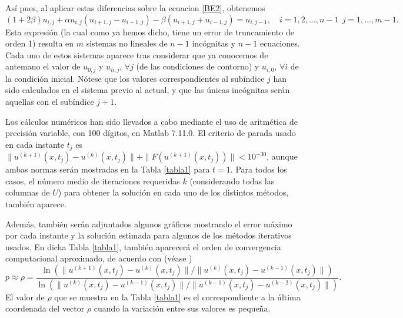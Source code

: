 Así pues, al aplicar estas diferencias sobre la ecuacion \eqref{BE2}, obtenemos
\begin{equation*}
(1+2\beta)u_{i,j}+\alpha u_{i,j}(u_{i+1,j}-u_{i-1,j})-\beta (u_{i+1,j}+u_{i-1,j})=u_{i,j-1},
\quad i=1,2,\ldots,n-1 \ \ j=1,\ldots,m-1.
\end{equation*}
Esta expresión (la cual como ya hemos dicho, tiene un error de truncamiento de orden 1) resulta en $m$ sistemas no lineales de $n-1$ incógnitas y $n-1$ ecuaciones. Cada uno de estos sistemas aparece tras considerar que ya conocemos de antemano el valor de $u_{0,j}$ y	$u_{n,j}$, $\forall j$ (de las condiciones de contorno) y $u_{i,0}$,
$\forall i$ de la condición inicial. Nótese que los valores correspondientes al subíndice $j$ han sido calculados en el sistema previo al actual, y que las únicas incógnitas serán aquellas con el subíndice $j+1$.

Los cálculos numéricos han sido llevados a cabo mediante el uso de aritmética de precisión variable, con 100 dígitos, en Matlab 7.11.0. El criterio de parada usado en cada instante $t_j$ es 
$\|u^{(k+1)}(x,t_j)-u^{(k)}(x,t_j)\|+\|F(u^{(k+1)}(x,t_j))\|<10^{-30}$, aunque ambas normas serán mostradas en la Tabla \ref{tabla1} para $t=1$. Para todos los casos, el número medio de iteraciones requeridas $\overline{k}$ (considerando todas las columnas de $U$) para obtener la solución en cada uno de los distintos métodos, también aparece.

Además, también serán adjuntados algunos gráficos mostrando el error máximo por cada instante y la solución estimada para algunos de los métodos iterativos usados. En dicha Tabla \ref{tabla1}, también aparecerá el orden de convergencia computacional aproximado, de acuerdo con (véase \cite{CT})
\[
p \approx \rho = \frac{\ln{(\|u^{(k+1)}(x,t_j)-u^{(k)}(x,t_j)\|/\|u^{(k)}(x,t_j)-u^{(k-1)}(x,t_j)\|)}}{\ln{(\|u^{(k)}(x,t_j)-u^{(k-1)}(x,t_j)\|/\|u^{(k-1)}(x,t_j)-u^{(k-2)}(x,t_j)\|)}}.
\]
El valor de $\rho$ que se muestra en la Tabla \ref{tabla1} es el correspondiente a la última coordenada del vector $\rho$ cuando la variación entre sus valores es pequeña.


